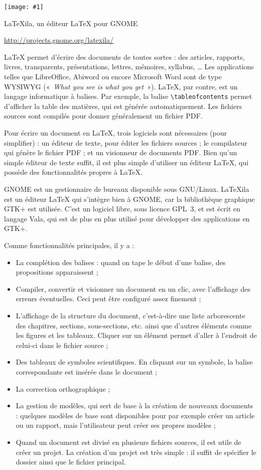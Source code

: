 \documentclass[a5paper,11pt]{article}
\def\titre#1#2{
  \noindent
  \begin{minipage}{0.14\linewidth}
  \texttt{[image: \#1]}
  \end{minipage}
  \begin{minipage}{0.85\linewidth}
    {\LARGE #2}

    \begin{flushright}
      \url{http://projects.gnome.org/latexila/}
    \end{flushright}
  \end{minipage}

  \vspace{0.5cm}
}
\begin{document}
\titre{latexila.png}{\LaTeX{}ila, un éditeur \LaTeX{} pour GNOME}

\LaTeX{} permet d'écrire des documents de toutes sortes : des articles, rapports, livres, transparents, présentations, lettres, mémoires, syllabus, … Les applications telles que LibreOffice, Abiword ou encore Microsoft Word sont de type WYSIWYG («~\textit{What you see is what you get}~»). \LaTeX{}, par contre, est un langage informatique à balises. Par exemple, la balise \texttt{\textbackslash{}tableofcontents} permet d'afficher la table des matières, qui est générée automatiquement. Les fichiers sources sont compilés pour donner généralement un fichier PDF.

Pour écrire un document en \LaTeX{}, trois logiciels sont nécessaires (pour simplifier) : un éditeur de texte, pour éditer les fichiers sources ; le compilateur qui génère le fichier PDF ; et un visionneur de documents PDF. Bien qu'un simple éditeur de texte suffit, il est plus simple d'utiliser un éditeur \LaTeX{}, qui possède des fonctionnalités propres à \LaTeX{}.

GNOME est un gestionnaire de bureaux disponible sous GNU/Linux. \LaTeX{}ila est un éditeur \LaTeX{} qui s'intègre bien à GNOME, car la bibliothèque graphique GTK+ est utilisée. C'est un logiciel libre, sous licence GPL~3, et est écrit en langage Vala, qui est de plus en plus utilisé pour développer des applications en GTK+.

Comme fonctionnalités principales, il y a :
\begin{itemize}
  \item La complétion des balises : quand on tape le début d'une balise, des propositions apparaissent ;
  \item Compiler, convertir et visionner un document en un clic, avec l'affichage des erreurs éventuelles. Ceci peut être configuré assez finement ;
  \item L'affichage de la structure du document, c'est-à-dire une liste arborescente des chapitres, sections, sous-sections, etc. ainsi que d'autres éléments comme les figures et les tableaux. Cliquer sur un élément permet d'aller à l'endroit de celui-ci dans le fichier source ;
  \item Des tableaux de symboles scientifiques. En cliquant sur un symbole, la balise correspondante est insérée dans le document ;
  \item La correction orthographique ;
  \item La gestion de modèles, qui sert de base à la création de nouveaux documents : quelques modèles de base sont disponibles pour par exemple créer un article ou un rapport, mais l'utilisateur peut créer ses propres modèles ;
  \item Quand un document est divisé en plusieurs fichiers sources, il est utile de créer un projet. La création d'un projet est très simple : il suffit de spécifier le dossier ainsi que le fichier principal.
\end{itemize}
\end{document}
